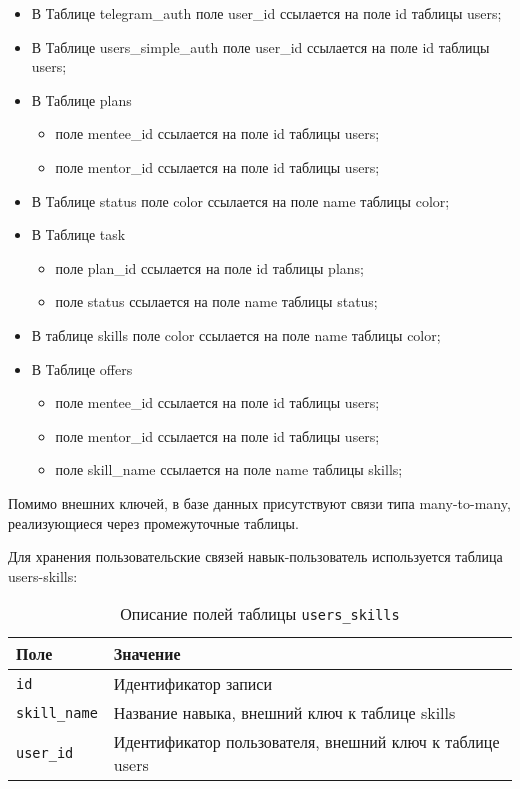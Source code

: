 \begin{itemize}
\item В Таблице telegram\_auth поле user\_id ссылается на поле id таблицы users;
\item В Таблице users\_simple\_auth поле user\_id ссылается на поле id таблицы users;
\item В Таблице plans 
	\begin{itemize}
		\item поле mentee\_id ссылается на поле id таблицы users;
		\item поле mentor\_id ссылается на поле id таблицы users;
	\end{itemize}
\item В Таблице status поле color ссылается на поле name таблицы color;
\item В Таблице task 
	\begin{itemize}
		\item поле plan\_id ссылается на поле id таблицы plans;
		\item поле status ссылается на поле name таблицы status;
	\end{itemize}
\item В таблице skills поле color ссылается на поле name таблицы color;
\item В Таблице offers 
	\begin{itemize}
		\item поле mentee\_id ссылается на поле id таблицы users;
		\item поле mentor\_id ссылается на поле id таблицы users;
		\item поле skill\_name ссылается на поле name таблицы skills;
	\end{itemize}
\end{itemize}
Помимо внешних ключей, в базе данных присутствуют связи типа many-to-many, реализующиеся через промежуточные таблицы.  

Для хранения пользовательские связей навык-пользователь используется таблица users-skills:
\begin{table}[!ht]
    \caption{Описание полей таблицы \texttt{users\_skills}}
    \label{tbl:users-skills}
    \begin{center}
        \begin{tabular}{|p{}p{}|}
            \hline
            \textbf{Поле} & \textbf{Значение} \\\hline
            \texttt{id} & Идентификатор записи \\\hline
            \texttt{skill\_name} & Название навыка, внешний ключ к таблице skills \\\hline
            \texttt{user\_id} & Идентификатор пользователя, внешний ключ к таблице users \\\hline
        \end{tabular}
    \end{center}
\end{table}

